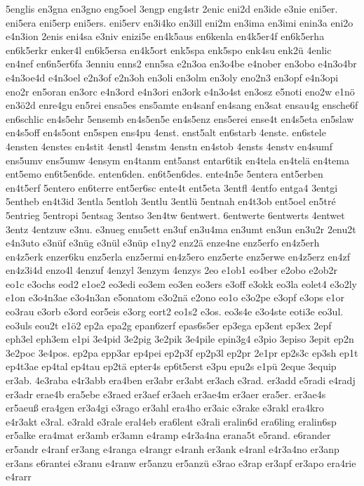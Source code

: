 {5englis
en3gna
en3gno
eng5oel
3engp
eng4str
2enic
eni2d
en3ide
e3nie
eni5er.
eni5era
eni5erp
eni5ers.
eni5erv
en3i4ko
en3ill
eni2m
en3ima
en3imi
enin3a
eni2o
e4n3ion
2enis
eni4sa
e3niv
enizi5e
en4k5aus
en6kenla
en4k5er4f
en6k5erha
en6k5erkr
enker4l
en6k5ersa
en4k5ort
enk5spa
enk5spo
enk4su
enk2ü
4enlic
en4nef
en6n5er6fa
3enniu
enns2
enn5sa
e2n3oa
en3o4be
e4nober
en3obo
e4n3o4br
e4n3oe4d
e4n3oel
e2n3of
e2n3oh
en3oli
en3olm
en3oly
eno2n3
en3opf
e4n3opi
eno2r
en5oran
en3orc
e4n3ord
e4n3ori
en3ork
e4n3o4st
en3osz
e5noti
eno2w
e1nö
en3ö2d
enre4gu
en5rei
ensa5es
ens5amte
en4sanf
en4sang
en3sat
ensau4g
ensche6f
en6schlic
en4s5ehr
5ensemb
en4s5en5e
en4s5enz
ens5erei
ense4t
en4s5eta
en5slaw
en4s5off
en4s5ont
en5spen
ens4pu
4enst.
enst5alt
en6starb
4enste.
en6stele
4ensten
4enstes
en4stit
4enstl
4enstm
4enstn
en4stob
4ensts
4enstv
en4sumf
ens5umv
ens5umw
4ensym
en4tanm
ent5anst
entar6tik
en4tela
en4telä
en4tema
ent5emo
en6t5en6de.
enten6den.
en6t5en6des.
ente4n5e
5entera
ent5erben
en4t5erf
5entero
en6terre
ent5er6sc
ente4t
ent5eta
3entfl
4entfo
entga4
3entgi
5entheb
en4t3id
3entla
5entloh
3entlu
3entlü
5entnah
en4t3ob
ent5oel
en5tré
5entrieg
5entropi
5entsag
3entso
3en4tw
6entwert.
6entwerte
6entwerts
4entwet
3entz
4entzuw
e3nu.
e3nueg
enu5ett
en3uf
en3u4ma
en3umt
en3un
en3u2r
2enu2t
e4n3uto
e3nüf
e3nüg
e3nül
e3nüp
e1ny2
enz2ä
enze4ne
enz5erfo
en4z5erh
en4z5erk
enzer6ku
enz5erla
enz5ermi
en4z5ero
enz5erte
enz5erwe
en4z5erz
en4zf
en4z3i4d
enzo4l
4enzuf
4enzyl
3enzym
4enzys
2eo
e1ob1
eo4ber
e2obo
e2ob2r
eo1c
e3ochs
eod2
e1oe2
eo3edi
eo3em
eo3en
eo3ers
e3off
e3okk
eo3la
eolet4
e3o2ly
e1on
e3o4n3ae
e3o4n3an
e5onatom
e3o2nä
e2ono
eo1o
e3o2pe
e3opf
e3ops
e1or
eo3rau
e3orb
e3ord
eor5eis
e3org
eort2
eo1s2
e3os.
eo3s4e
e3o4ste
eoti3e
eo3ul.
eo3uls
eou2t
e1ö2
ep2a
epa2g
epan6zerf
epas6s5er
ep3ega
ep3ent
ep3ex
2epf
eph3el
eph3em
e1pi
3e4pid
3e2pig
3e2pik
3e4pile
epin3g4
e3pio
3episo
3epit
ep2n
3e2poc
3e4pos.
ep2pa
epp3ar
ep4pei
ep2p3f
ep2p3l
ep2pr
2e1pr
ep2s3c
ep3sh
ep1t
ep4t3ae
ep4tal
ep4tau
ep2tä
epter4s
ep6t5erst
e3pu
epu2s
e1pü
2eque
3equip
er3ab.
4e3raba
e4r3abb
era4ben
er3abr
er3abt
er3ach
e3rad.
er3add
e5radi
e4radj
er3adr
erae4b
era5ebe
e3raed
er3aef
er3aeh
er3ae4m
er3aer
era5er.
er3ae4s
er5aeuß
era4gen
er3a4gi
e3rago
er3ahl
era4ho
er3aic
e3rake
e3rakl
era4kro
e4r3akt
e3ral.
e3rald
e3rale
eral4eb
era6lent
e3rali
eralin6d
era6ling
eralin6sp
er5alke
era4mat
er3amb
er3amn
e4ramp
e4r3a4na
erana5t
e5rand.
e6rander
er5andr
e4ranf
er3ang
e4ranga
e4rangr
e4ranh
er3ank
e4ranl
e4r3a4no
er3anp
er3ans
e6rantei
e3ranu
e4ranw
er5anzu
er5anzü
e3rao
e3rap
er3apf
er3apo
era4rie
e4rarr
}
